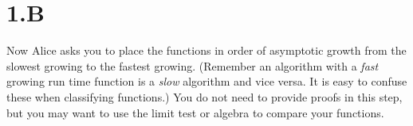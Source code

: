 \section{1.B}

    Now Alice asks you to place the functions in order of asymptotic growth from the slowest growing to the fastest growing. (Remember an algorithm with a \textit{fast} growing run time function is a \textit{slow} algorithm and vice versa. It is easy to confuse these when classifying functions.) You do not need to provide proofs in this step, but you may want to use the limit test or algebra to compare your functions.